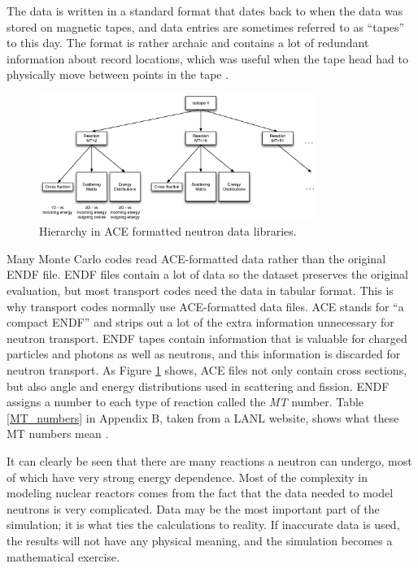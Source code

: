 The data is written in a standard format that dates back to when the data was stored on magnetic tapes, and data entries are sometimes referred to as ``tapes'' to this day.  The format is rather archaic and contains a lot of redundant information about record locations, which was useful when the tape head had to physically move between points in the tape \cite{endfnums}.  

\begin{figure}[h!]
  \centering
    \includegraphics[width=0.8\textwidth]{graphics/data_levels.eps}
     \caption{Hierarchy in ACE formatted neutron data libraries.  \label{data_levels}}
\end{figure}

Many Monte Carlo codes read ACE-formatted data rather than the original ENDF file.  ENDF files contain a lot of data so the dataset preserves the original evaluation, but most transport codes need the data in tabular format.  This is why transport codes normally use ACE-formatted data files. \cite{jaakko}  ACE stands for ``a compact ENDF'' and strips out a lot of the extra information unnecessary for neutron transport.  ENDF tapes contain information that is valuable for charged particles and photons as well as neutrons, and this information is discarded for neutron transport. As Figure \ref{data_levels} shows, ACE files not only contain cross sections, but also angle and energy distributions used in scattering and fission.  ENDF assigns a number to each type of reaction called the \emph{MT} number.  Table \ref{MT_numbers} in Appendix B, taken from a LANL website, shows what these MT numbers mean \cite{endfnums}.  

It can clearly be seen that there are many reactions a neutron can undergo, most of which have very strong energy dependence.  Most of the complexity in modeling nuclear reactors comes from the fact that the data needed to model neutrons is very complicated.  Data may be the most important part of the simulation; it is what ties the calculations to reality.  If inaccurate data is used, the results will not have any physical meaning, and the simulation becomes a mathematical exercise.  

